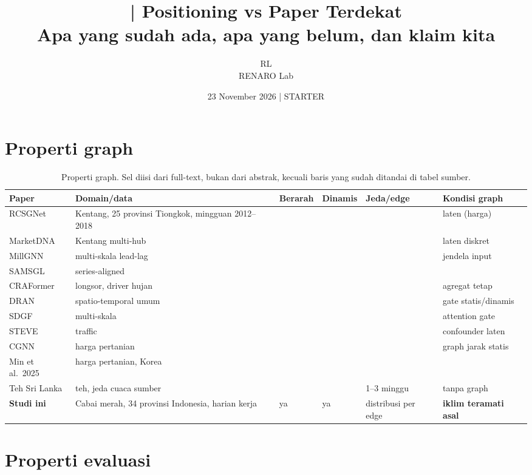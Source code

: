 \documentclass[11pt,a4paper]{article}
\title{\jobid{RL-H2-02} | Positioning vs Paper Terdekat\\
\large Apa yang sudah ada, apa yang belum, dan klaim kita}
\author{RL \\ \small RENARO Lab}
\date{23 November 2026 \quad | \quad \textcolor{red!75!black}{STARTER}}
\begin{document}
\maketitle

\section{Properti graph}

\begin{table}[H]
\centering
\footnotesize
\setlength{\tabcolsep}{3pt}
\begin{tabular}{@{}L{2.2cm}L{4.0cm}C{1.5cm}C{1.5cm}L{2.5cm}L{2.7cm}@{}}
\toprule
Paper & Domain/data & Berarah & Dinamis & Jeda/edge & Kondisi graph \\
\midrule
RCSGNet & Kentang, 25 provinsi Tiongkok, mingguan 2012--2018
& \todo{} & \todo{} & \todo{} & laten (harga) \\
MarketDNA & Kentang multi-hub & \todo{} & \todo{} & \todo{} & laten diskret \\
MillGNN & multi-skala lead-lag & \todo{} & \todo{} & \todo{} & jendela input \\
SAMSGL & series-aligned & \todo{} & \todo{} & \todo{} & \todo{} \\
CRAFormer & longsor, driver hujan & \todo{} & \todo{} & \todo{} & agregat tetap \\
DRAN & spatio-temporal umum & \todo{} & \todo{} & \todo{} & gate statis/dinamis \\
SDGF & multi-skala & \todo{} & \todo{} & \todo{} & attention gate \\
STEVE & traffic & \todo{} & \todo{} & \todo{} & confounder laten \\
CGNN & harga pertanian & \todo{} & \todo{} & \todo{} & graph jarak statis \\
Min et al.\ 2025 & harga pertanian, Korea & \todo{} & \todo{} & \todo{} & \todo{} \\
Teh Sri Lanka & teh, jeda cuaca sumber & \todo{} & \todo{} & 1--3 minggu & tanpa graph \\
\midrule
\textbf{Studi ini} & Cabai merah, 34 provinsi Indonesia, harian kerja
& ya & ya & distribusi per edge & \textbf{iklim teramati asal} \\
\bottomrule
\end{tabular}
\caption{Properti graph. Sel \todo{} diisi dari full-text, bukan dari abstrak,
kecuali baris yang sudah ditandai di tabel sumber.}
\end{table}

\section{Properti evaluasi}
\end{document}

